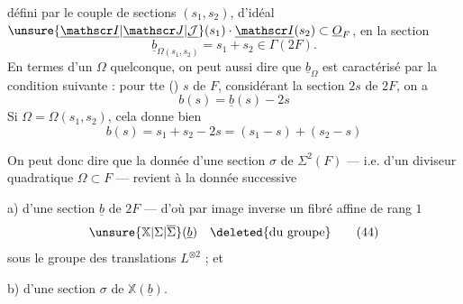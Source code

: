 
 défini par le couple de sections $(s_1,s_2)$,
d'idéal $\unsure{\underline{\mathscr I}|\underline{\mathscr J}|\underline{\mathcal J}}(s_1)\cdot\underline{\mathscr I}(s_2)\subset\underline O_F$, en la
section
\[
\underline b_{\Omega(s_1,s_2)}=s_1+s_2\in\Gamma(2F). \tag*{(41)}
\]
En termes d'un $\Omega$ quelconque, on
peut aussi dire que $\underline b_\Omega$ est caractérisé par
la condition suivante : pour tte 
() $s$ de $F$, considérant la section
$2s$ de $2F$, on a
\[
 b(s)=\underline b(s)-2s \tag*{(42)}
\]
Si $\Omega=\Omega(s_1,s_2)$, cela donne bien
\[
 b(s)=s_1+s_2-2s=(s_1-s)+(s_2-s) \tag*{(43)}
\]

On peut donc dire que la donnée
d'une section $\sigma$ de $\Sigma^2(F)$ --- i.e. d'un
diviseur quadratique $\Omega\subset F$ --- revient à
la donnée successive

a) d'une section $\underline b$ de $2F$ --- d'où
par  image inverse un fibré affine de
rang $1$
\[
 \unsure{\mathbb X|\Sigma|\overline\Sigma}(\underline b)\quad\deleted{\text{du groupe}} \tag*{(44)}
\]
sous le groupe des translations $L^{\otimes2}$ ; et

b) d'une section $\sigma$ de $\mathbb X(\underline b)$.


